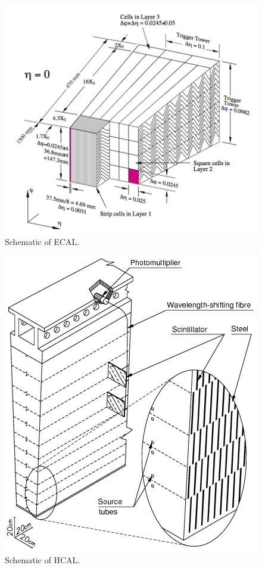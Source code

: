 \begin{figure}[h!]
  \centering
  \includegraphics[width=\hsize]{figures/Detector/ecal.pdf}
  \caption{Schematic of ECAL.} 
  \label{fig:ecal}
\end{figure}
\FloatBarrier




\begin{figure}[h!]
  \centering
  \includegraphics[width=\hsize]{figures/Detector/hcal.png}
  \caption{Schematic of HCAL.} 
  \label{fig:hcal}
\end{figure}
\FloatBarrier


